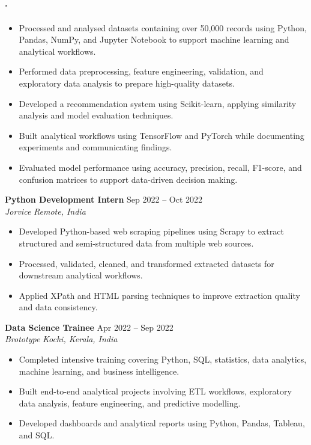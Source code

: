 "\documentclass[10pt,a4paper]{article}
\newcommand{\resumeSubheading}[4]{
\textbf{#1} \hfill #2 \\
\textit{#3} \hfill \textit{#4}
}
\begin{document}
\begin{itemize}
\item Processed and analysed datasets containing over 50,000 records using Python, Pandas, NumPy, and Jupyter Notebook to support machine learning and analytical workflows.
\item Performed data preprocessing, feature engineering, validation, and exploratory data analysis to prepare high-quality datasets.
\item Developed a recommendation system using Scikit-learn, applying similarity analysis and model evaluation techniques.
\item Built analytical workflows using TensorFlow and PyTorch while documenting experiments and communicating findings.
\item Evaluated model performance using accuracy, precision, recall, F1-score, and confusion matrices to support data-driven decision making.
\end{itemize}
\resumeSubheading
{Python Development Intern}{Sep 2022 -- Oct 2022}
{Jorvice}{Remote, India}
\begin{itemize}
\item Developed Python-based web scraping pipelines using Scrapy to extract structured and semi-structured data from multiple web sources.
\item Processed, validated, cleaned, and transformed extracted datasets for downstream analytical workflows.
\item Applied XPath and HTML parsing techniques to improve extraction quality and data consistency.
\end{itemize}
\resumeSubheading
{Data Science Trainee}{Apr 2022 -- Sep 2022}
{Brototype}{Kochi, Kerala, India}
\begin{itemize}
\item Completed intensive training covering Python, SQL, statistics, data analytics, machine learning, and business intelligence.
\item Built end-to-end analytical projects involving ETL workflows, exploratory data analysis, feature engineering, and predictive modelling.
\item Developed dashboards and analytical reports using Python, Pandas, Tableau, and SQL.
\end{itemize}
\end{document}
